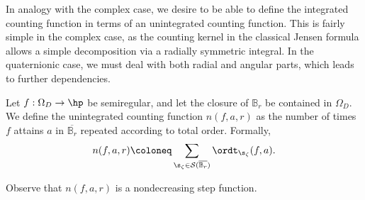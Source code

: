 \documentclass{amsart}
\begin{document}
In analogy with the complex case, we desire to be able to define the integrated counting function in terms of an unintegrated counting function. This is fairly simple in the complex case, as the counting kernel in the classical Jensen formula allows a simple decomposition via a radially symmetric integral. In the quaternionic case, we must deal with both radial and angular parts, which leads to further dependencies. 

\begin{defin}
     Let $f:\Omega_D\to\hp$ be semiregular, and let the closure of $\mathbb{B}_r$ be contained in $\Omega_D$. We define the unintegrated counting function $n(f,a,r)$ as the number of times $f$ attains $a$ in $\overline{\mathbb B_r}$ repeated according to total order. Formally, \[n(f,a,r)\coloneq \sum_{\s_{\zeta}\in\mathcal S(\overline{\mathbb B_r})}\ordt_{\s_\zeta}(f,a).\]
\end{defin}
Observe that $n(f,a,r)$ is a nondecreasing step function. 
\end{document}
